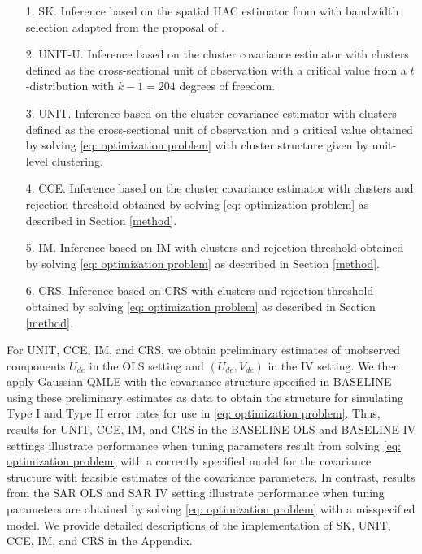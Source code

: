 \documentclass[preprint]{imsart}
\numberwithin{equation}{section}
\theoremstyle{plain}
\theoremstyle{definition}
\renewcommand{\(}{\left(}
\renewcommand{\)}{\right)}
\renewcommand{\[}{\left[}
\renewcommand{\]}{\right]}
\newcommand{\G}{k}
\begin{document}
\begin{itemize}
	\item[ 1.] SK. Inference based on the spatial HAC estimator from \cite{Sun2015} with bandwidth selection adapted from the proposal of \cite{Lazarus2018}.
	\item[ 2.] UNIT-U. Inference based on the cluster covariance estimator with clusters defined as the cross-sectional unit of observation with a critical value from a $t$-distribution with $\G-1 = 204$ degrees of freedom.
	\item[ 3.] UNIT. Inference based on the cluster covariance estimator with clusters defined as the cross-sectional unit of observation and a critical value obtained by solving \eqref{eq: optimization problem} with cluster structure given by unit-level clustering. 
	\item[ 4.] CCE. Inference based on the cluster covariance estimator with clusters and rejection threshold obtained by solving \eqref{eq: optimization problem} as described in Section \ref{method}.%
	\item[ 5.] IM. Inference based on IM with clusters and rejection threshold obtained by solving \eqref{eq: optimization problem} as described in Section \ref{method}.%
	\item[ 6.] CRS. Inference based on CRS with clusters and rejection threshold obtained by solving \eqref{eq: optimization problem} as described in Section \ref{method}.%
\end{itemize}



For UNIT, CCE, IM, and CRS, we obtain preliminary estimates of unobserved components $U_{de}$ in the OLS setting and $(U_{de},V_{de})$ in the IV setting. We then apply Gaussian QMLE with the covariance structure specified in BASELINE using these preliminary estimates as data to obtain the structure for simulating Type I and Type II error rates for use in \eqref{eq: optimization problem}. Thus, results for UNIT, CCE, IM, and CRS in the BASELINE OLS and BASELINE IV settings illustrate performance when tuning parameters result from solving \eqref{eq: optimization problem} with a correctly specified model for the covariance structure with feasible estimates of the covariance parameters. In contrast, results from the SAR OLS and SAR IV setting illustrate performance when tuning parameters are obtained by solving \eqref{eq: optimization problem} with a misspecified model. We provide detailed descriptions of the implementation of SK, UNIT, CCE, IM, and CRS in the Appendix.
\end{document}
